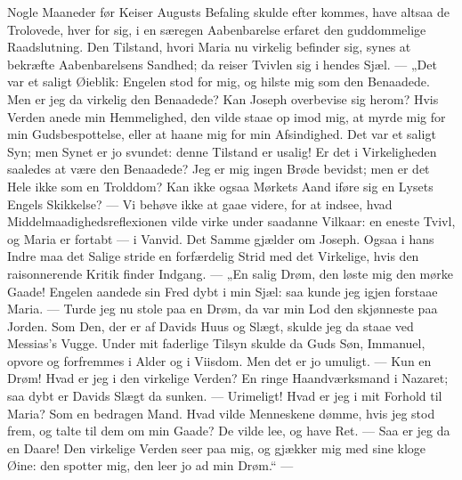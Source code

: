 \documentclass[12pt,a4paper]{book}
\begin{document}
Nogle Maaneder før Keiser Augusts Befaling skulde efter\-%
kommes, have altsaa de Trolovede, hver for sig, i en særegen Aabenbarelse erfaret den
guddommelige Raadslutning. Den Tilstand, hvori Maria nu virkelig befinder sig, synes
at bekræfte Aabenbarelsens Sandhed; da reiser Tvivlen sig i hendes Sjæl. --- „Det var
et saligt Øieblik: Engelen stod for mig, og hilste mig som den Benaadede. Men er jeg
da virkelig den Benaadede? Kan Joseph overbevise sig herom? Hvis Verden anede min
Hemmelighed, den vilde staae op imod mig, at myrde mig for min Gudsbespottelse, eller
at haane mig for min Afsindighed. Det var et saligt Syn; men Synet er jo svundet:
denne Tilstand er usalig! Er det i Virkeligheden saaledes at være den Benaadede? Jeg
er mig ingen Brøde bevidst; men er det Hele ikke som en Trolddom? Kan ikke ogsaa
Mørkets Aand iføre sig en Lysets Engels Skikkelse? --- Vi behøve ikke at gaae videre,
for at indsee, hvad Middelmaadighedsreflexionen vilde virke under saadanne Vilkaar:
en eneste Tvivl, og Maria er fortabt --- i Vanvid. Det Samme gjælder om Joseph. Ogsaa
i hans Indre maa det Salige stride en forfærdelig Strid med det Virkelige, hvis den
raisonnerende Kritik finder Indgang. --- „En salig Drøm, den løste mig den mørke
Gaade! Engelen aandede sin Fred dybt i min Sjæl: saa kunde jeg igjen forstaae Maria.
--- Turde jeg nu stole paa en Drøm, da var min Lod den skjønneste paa Jorden. Som
Den, der er af Davids Huus og Slægt, skulde jeg da staae ved Messias's Vugge. Under
mit faderlige Tilsyn skulde da Guds Søn, Immanuel, opvore og forfremmes i Alder og i
Viisdom. Men det er jo umuligt. --- Kun en Drøm! Hvad er jeg i den virkelige Verden?
En ringe Haandværksmand i Nazaret; saa dybt er Davids Slægt da sunken. --- Urimeligt!
Hvad er jeg i mit Forhold til Maria? Som en bedragen Mand. Hvad vilde Menneskene
dømme, hvis jeg stod frem, og talte til dem om min
Gaade? De vilde lee, og have Ret. --- Saa er jeg da en Daare! Den virkelige Verden
seer paa mig, og gjækker mig med sine kloge Øine: den spotter mig, den leer jo ad min
Drøm.“ ---
\end{document}

